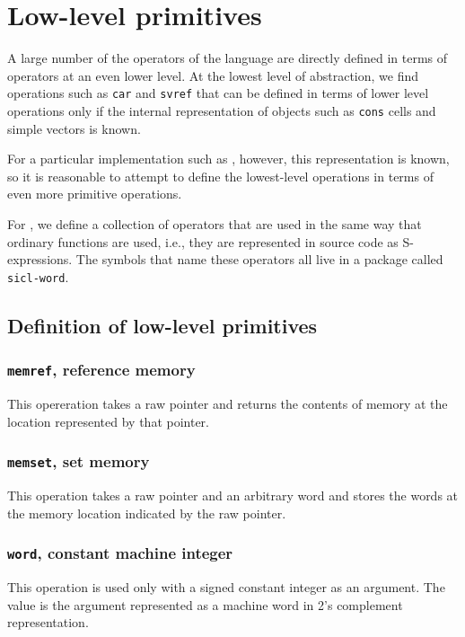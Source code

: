 \chapter{Low-level primitives}
\label{chap-low-level-primitives}

A large number of the operators of the \cl{} language are directly
defined in terms of operators at an even lower level.  At the lowest
level of abstraction, we find operations such as \texttt{car} and
\texttt{svref} that can be defined in terms of lower level operations
only if the internal representation of objects such as \texttt{cons}
cells and simple vectors is known.

For a particular implementation such as \sysname{}, however, this
representation is known, so it is reasonable to attempt to define the
lowest-level \cl{} operations in terms of even more primitive
operations. 

For \sysname{}, we define a collection of operators that are used
in the same way that ordinary \cl{} functions are used, i.e., they are
represented in source code as S-expressions.  The symbols that name
these operators all live in a package called \texttt{sicl-word}.  

\section{Definition of low-level primitives}

\subsection{\texttt{memref}, reference memory}

This opereration takes a raw pointer and returns the contents of
memory at the location represented by that pointer.

\subsection{\texttt{memset}, set memory}

This operation takes a raw pointer and an arbitrary word and stores
the words at the memory location indicated by the raw pointer.

\subsection{\texttt{word}, constant machine integer}

This operation is used only with a signed constant integer as an
argument.  The value is the argument represented as a machine word in
2's complement representation.

